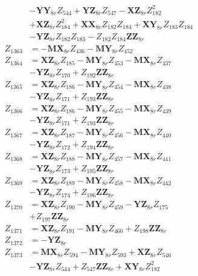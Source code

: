 \begin{multicols}{2}
\begin{align}
&- \mathbf{YY}_{8r}Z_{544} + \mathbf{YZ}_{8r}Z_{547} - \mathbf{XZ}_{8r}Z_{182}^2  \nonumber \\
&+ \mathbf{XZ}_{8r}Z_{184}^2 + \mathbf{XX}_{8r}Z_{182}Z_{184} + \mathbf{XY}_{8r}Z_{183}Z_{184}  \nonumber \\
&- \mathbf{YZ}_{8r}Z_{182}Z_{183} - Z_{182}Z_{184}\mathbf{ZZ}_{8r} \nonumber \\
Z_{1363} &= - \mathbf{MX}_{8r}Z_{436} - \mathbf{MY}_{8r}Z_{452} \nonumber \\
Z_{1364} &= \mathbf{XZ}_{8r}Z_{185} - \mathbf{MY}_{8r}Z_{453} - \mathbf{MX}_{8r}Z_{437}  \nonumber \\
&- \mathbf{YZ}_{8r}Z_{170} + Z_{192}\mathbf{ZZ}_{8r} \nonumber \\
Z_{1365} &= \mathbf{XZ}_{8r}Z_{186} - \mathbf{MY}_{8r}Z_{454} - \mathbf{MX}_{8r}Z_{438}  \nonumber \\
&- \mathbf{YZ}_{8r}Z_{171} + Z_{193}\mathbf{ZZ}_{8r} \nonumber \\
Z_{1366} &= \mathbf{XZ}_{8r}Z_{186} - \mathbf{MY}_{8r}Z_{455} - \mathbf{MX}_{8r}Z_{439}  \nonumber \\
&- \mathbf{YZ}_{8r}Z_{171} + Z_{193}\mathbf{ZZ}_{8r} \nonumber \\
Z_{1367} &= \mathbf{XZ}_{8r}Z_{187} - \mathbf{MY}_{8r}Z_{456} - \mathbf{MX}_{8r}Z_{440}  \nonumber \\
&- \mathbf{YZ}_{8r}Z_{172} + Z_{194}\mathbf{ZZ}_{8r} \nonumber \\
Z_{1368} &= \mathbf{XZ}_{8r}Z_{188} - \mathbf{MY}_{8r}Z_{457} - \mathbf{MX}_{8r}Z_{441}  \nonumber \\
&- \mathbf{YZ}_{8r}Z_{173} + Z_{195}\mathbf{ZZ}_{8r} \nonumber \\
Z_{1369} &= \mathbf{XZ}_{8r}Z_{189} - \mathbf{MY}_{8r}Z_{458} - \mathbf{MX}_{8r}Z_{442}  \nonumber \\
&- \mathbf{YZ}_{8r}Z_{174} + Z_{196}\mathbf{ZZ}_{8r} \nonumber \\
Z_{1370} &= \mathbf{XZ}_{8r}Z_{190} - \mathbf{MY}_{8r}Z_{459} - \mathbf{YZ}_{8r}Z_{175}  \nonumber \\
&+ Z_{197}\mathbf{ZZ}_{8r} \nonumber \\
Z_{1371} &= \mathbf{XZ}_{8r}Z_{191} - \mathbf{MY}_{8r}Z_{460} + Z_{198}\mathbf{ZZ}_{8r} \nonumber \\
Z_{1372} &= -\mathbf{YZ}_{8r} \nonumber \\
Z_{1373} &= \mathbf{MX}_{8r}Z_{594} - \mathbf{MY}_{8r}Z_{593} + \mathbf{XZ}_{8r}Z_{546}  \nonumber \\
&- \mathbf{YZ}_{8r}Z_{544} + Z_{547}\mathbf{ZZ}_{8r} + \mathbf{XY}_{8r}Z_{182}^2  \nonumber \\

\end{align}
\end{multicols}
